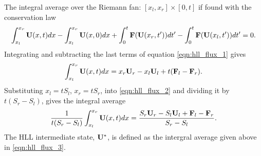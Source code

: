 

%

\label{app:hll_flux}

The integral average over the Riemann fan: $[x_l,x_r] \times [0,t]$ if found with the conservation law
\begin{gather}
\label{eqn:hll_flux_1}
\int_{x_l}^{x_r} \mathbf{U}(x,t) dx - \int_{x_l}^{x_r} \mathbf{U}(x,0) dx + \int_{0}^{t} \mathbf{F}(\mathbf{U}(x_r,t')) dt'
- \int_{0}^{t} \mathbf{F}(\mathbf{U}(x_l,t')) dt' = 0.
\end{gather}
Integrating and subtracting the last terms of equation \eqref{eqn:hll_flux_1} gives
\begin{gather}
\label{eqn:hll_flux_2}
\int_{x_l}^{x_r} \mathbf{U}(x,t) dx = x_r\mathbf{U}_r - x_l\mathbf{U}_l + t(\mathbf{F}_l - \mathbf{F}_r).
\end{gather}
Substituting $x_l  = t S_l$, $x_r  = t S_r$, into \eqref{eqn:hll_flux_2} and dividing it by $t(S_r - S_l)$, gives the integral average 
\begin{gather}
\label{eqn:hll_flux_3}
\frac{1}{t(S_r - S_l)}\int_{x_l}^{x_r} \mathbf{U}(x,t) dx = \frac{S_r\mathbf{U}_r - S_l\mathbf{U}_l + \mathbf{F}_l - \mathbf{F}_r}{S_r - S_l}.
\end{gather}
The HLL intermediate state, $\mathbf{U}^*$, is defined as the intergral average given above in \eqref{eqn:hll_flux_3}.


